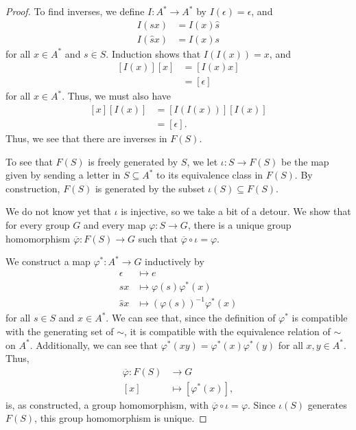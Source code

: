 \documentclass[10pt]{mypackage}
\begin{document}
\begin{proof}
  To find inverses, we define $I: A^{\ast}\rightarrow A^{\ast}$ by $I\left(\epsilon\right) = \epsilon$, and
  \begin{align*}
    I\left(sx\right) &= I(x)\hat{s}\\
    I\left(\hat{s}x\right) &= I(x)s
  \end{align*}
  for all $x\in A^{\ast}$ and $s\in S$. Induction shows that $I\left(I\left(x\right)\right) = x$, and
  \begin{align*}
    \left[I\left(x\right)\right]\left[x\right] &= \left[I\left(x\right)x\right]\\
                                               &= \left[\epsilon\right]
  \end{align*}
  for all $x\in A^{\ast}$. Thus, we must also have
  \begin{align*}
    \left[x\right]\left[I(x)\right] &= \left[I\left(I\left(x\right)\right)\right]\left[I\left(x\right)\right]\\
                                    &= \left[\epsilon\right].
  \end{align*}
  Thus, we see that there are inverses in $F(S)$.\newline

  To see that $F(S)$ is freely generated by $S$, we let $\iota: S\rightarrow F(S)$ be the map given by sending a letter in $S\subseteq A^{\ast}$ to its equivalence class in $F(S)$. By construction, $F(S)$ is generated by the subset $\iota\left(S\right)\subseteq F(S)$.\newline

  We do not know yet that $\iota$ is injective, so we take a bit of a detour. We show that for every group $G$ and every map $\varphi: S\rightarrow G$, there is a unique group homomorphism $\overline{\varphi}:F(S) \rightarrow G$ such that $\overline{\varphi}\circ \iota = \varphi$.\newline

  We construct a map $\varphi^{\ast}: A^{\ast}\rightarrow G$ inductively by
  \begin{align*}
    \epsilon &\mapsto e\\
    sx &\mapsto \varphi(s)\varphi^{\ast}\left(x\right)\\
    \hat{s}x &\mapsto \left(\varphi\left(s\right)\right)^{-1}\varphi^{\ast}\left(x\right)
  \end{align*}
  for all $s\in S$ and $x\in A^{\ast}$. We can see that, since the definition of $\varphi^{\ast}$ is compatible with the generating set of $\sim$, it is compatible with the equivalence relation of $\sim$ on $A^{\ast}$. Additionally, we can see that $\varphi^{\ast}\left(xy\right) = \varphi^{\ast}\left(x\right)\varphi^{\ast}\left(y\right)$ for all $x,y\in A^{\ast}$. Thus,
  \begin{align*}
    \overline{\varphi}: F\left(S\right) &\rightarrow G\\
    \left[x\right] &\mapsto \left[\varphi^{\ast}\left(x\right)\right],
  \end{align*}
  is, as constructed, a group homomorphism, with $\overline{\varphi}\circ \iota = \varphi$. Since $\iota\left(S\right)$ generates $F(S)$, this group homomorphism is unique.\newline
  

\end{proof}
\end{document}
